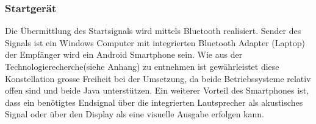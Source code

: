 \subsubsection{Startgerät}
Die Übermittlung des Startsignals wird mittels Bluetooth realisiert. Sender des Signals ist ein Windows Computer mit integrierten Bluetooth Adapter (Laptop) der Empfänger wird ein Android Smartphone sein. Wie aus der Technologierecherche(siehe Anhang) zu entnehmen ist gewährleistet diese Konstellation grosse Freiheit bei der Umsetzung, da beide Betriebssysteme relativ offen sind und beide Java unterstützen.
Ein weiterer Vorteil des Smartphones ist, dass ein benötigtes Endsignal über die integrierten Lautsprecher als akustisches Signal oder über den Display als eine visuelle Ausgabe erfolgen kann.
